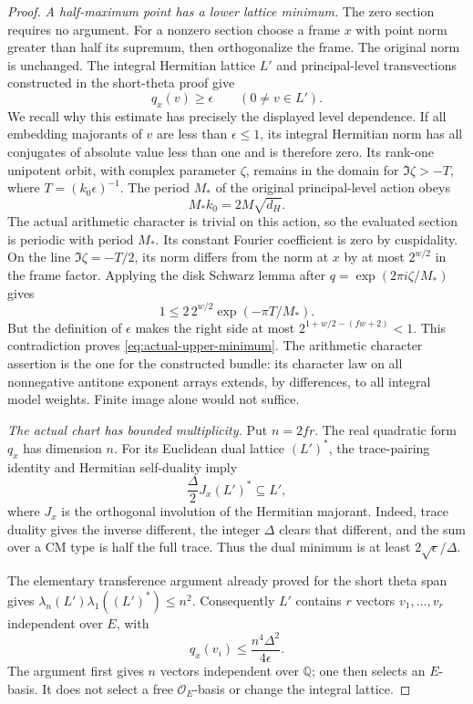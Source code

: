 \begin{proof}
\emph{A half-maximum point has a lower lattice minimum.}
The zero section requires no argument.  For a nonzero section choose
a frame $x$ with point norm greater than half its supremum, then
orthogonalize the frame.  The original norm is unchanged.  The
integral Hermitian lattice $L'$ and principal-level transvections
constructed in the short-theta proof give
\begin{equation}\label{eq:actual-upper-minimum}
                    q_x(v)\ge\epsilon
                  \qquad(0\ne v\in L').
\end{equation}
We recall why this estimate has precisely the displayed level
dependence.  If all embedding majorants of $v$ are less than
$\epsilon\le1$, its integral Hermitian norm has all conjugates of
absolute value less than one and is therefore zero.  Its rank-one
unipotent orbit, with complex parameter $\zeta$, remains in the
domain for $\Im\zeta>-T$, where
$T=(k_0\epsilon)^{-1}$.  The period $M_*$ of the original
principal-level action obeys
\[
                       M_*k_0=2M\sqrt{d_H}.
\]
The actual arithmetic character is trivial on this action, so the
evaluated section is periodic with period $M_*$.  Its constant
Fourier coefficient is zero by cuspidality.  On the line
$\Im\zeta=-T/2$, its norm differs from the norm at $x$ by at most
$2^{w/2}$ in the frame factor.  Applying the disk Schwarz lemma
after $q=\exp(2\pi i\zeta/M_*)$ gives
\[
              1\le2\,2^{w/2}\exp(-\pi T/M_*).
\]
But the definition of $\epsilon$ makes the right side at most
$2^{1+w/2-(fw+2)}<1$.  This contradiction proves
\eqref{eq:actual-upper-minimum}.  The arithmetic character assertion
is the one for the constructed bundle: its character law on all
nonnegative antitone exponent arrays extends, by differences, to
all integral model weights.  Finite image alone would not suffice.

\emph{The actual chart has bounded multiplicity.}
Put $n=2fr$.  The real quadratic form $q_x$ has dimension $n$.
For its Euclidean dual lattice $(L')^*$, the trace-pairing identity
and Hermitian self-duality imply
\[
             \frac{\Delta}{2}J_x(L')^*\subseteq L',
\]
where $J_x$ is the orthogonal involution of the Hermitian majorant.
Indeed, trace duality gives the inverse different, the integer
$\Delta$ clears that different, and the sum over a CM type is
half the full trace.  Thus the dual minimum is at least
$2\sqrt\epsilon/\Delta$.

The elementary transference argument already proved for the short
theta span gives
$\lambda_n(L')\lambda_1((L')^*)\le n^2$.
Consequently $L'$ contains $r$ vectors $v_1,\ldots,v_r$ independent
over $E$, with
\begin{equation}\label{eq:actual-upper-short-basis}
                  q_x(v_i)\le\frac{n^4\Delta^2}{4\epsilon}.
\end{equation}
The argument first gives $n$ vectors independent over $\mathbb Q$;
one then selects an $E$-basis.  It does not select a free
$\mathcal O_E$-basis or change the integral lattice.


\end{proof}
